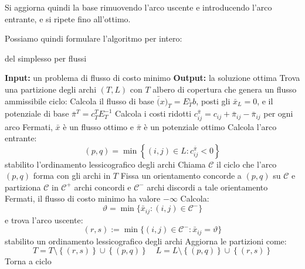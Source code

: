 \documentclass[a4paper,11pt]{article}
\begin{document}
Si aggiorna quindi la base rimuovendo l'arco uscente e introducendo l'arco entrante, e si ripete fino all'ottimo.

Possiamo quindi formulare l'algoritmo per intero:

\begin{algorithm}[H]
\caption{del simplesso per flussi}
\begin{algorithmic}
	\STATE \textbf{Input:} un problema di flusso di costo minimo 
	\STATE \textbf{Output:} la soluzione ottima 
	\STATE Trova una partizione degli archi $(T,L)$ con $T$ albero di copertura che genera un flusso ammissibile
	\STATE \textsf{ciclo:}
	\STATE Calcola il flusso di base $\bar(x)_T = E_T^{_1} b$, posti gli $\bar{x}_L = 0$, e il potenziale di base $\bar{\pi}^T = c_T^T E_T^{-1}$
	\STATE Calcola i costi ridotti $c_{ij}^{\bar{\pi}} = c_{ij} + \bar{\pi}_{ij} - \bar{\pi}_{ij}$ per ogni arco
	\STATE Fermati, $\bar{x}$ è un flusso ottimo e $\bar{\pi}$ è un potenziale ottimo
\ELSE
		\STATE Calcola l'arco entrante: 
		$$
		(p, q) = \min \left\{ (i, j) \in L : c_{ij}^{\bar{\pi}} < 0 \right\}
		$$
		stabilito l'ordinamento lessicografico degli archi
		\STATE Chiama $\mathcal{C}$ il ciclo che l'arco $(p, q)$ forma con gli archi in $T$
		\STATE Fissa un orientamento concorde a $(p,q)$ su $\mathcal{C}$ e partiziona $\mathcal{C}$ in $\mathcal{C^+}$ archi concordi e $\mathcal{C^-}$ archi discordi a tale orientamento
	\ENDIF
		\STATE Fermati, il flusso di costo minimo ha valore $-\infty$ 
	\ELSE
		\STATE Calcola:
		$$
		\vartheta = \min\{ \bar{x}_{ij} : (i, j) \in \mathcal{C}^- \}
		$$
		e trova l'arco uscente: 
		$$ 
		(r, s) := \min\{ (i, j) \in \mathcal{C}^- : \bar{x}_{ij} = \vartheta \} 
		$$
		stabilito un ordinamento lessicografico degli archi
	\ENDIF
	\STATE Aggiorna le partizioni come:
	$$
	T = T \setminus \left\{ (r,s) \right\} \cup \left\{ (p, q) \right\} \quad L = L \setminus \left\{ (p, q) \right\} \cup \left\{ (r, s) \right\}
	$$
	\STATE Torna a \textsf{ciclo}
\end{algorithmic}
\end{algorithm}
\end{document}

